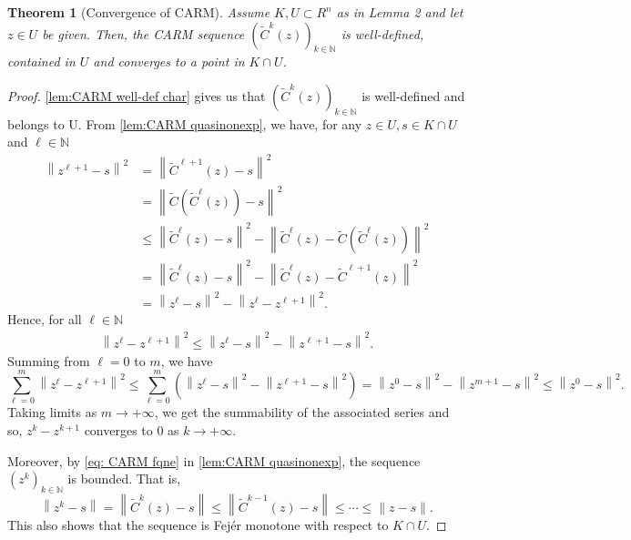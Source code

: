 \documentclass[smallextended,numbook,nospthms]{svjour3}
\theoremstyle{plain}
\newtheorem{theorem}{Theorem}[section]
\theoremstyle{definition}
\def\NN{\mathds N}
\begin{document}
\begin{theorem}[Convergence of CARM]\label{thm:CARM conv}
	Assume $K, U \subset R^{n}$ as in Lemma 2 and let $z \in U$ be given. Then, the CARM sequence $\left(\tilde{C}^{k}(z)\right)_{k \in \NN}$ is well-defined, contained in $U$ and converges to a point in $K \cap U$.
\end{theorem}
\begin{proof}
	 \cref{lem:CARM well-def char} gives us that $\left(\tilde{C}^{k}(z)\right)_{k \in \NN}$ is well-defined and belongs to U.
	From  \cref{lem:CARM quasinonexp}, we have, for any $z \in U, s \in K \cap U$ and $\ell \in \NN$
	\begin{align}
		\left\|z^{\ell+1}-s\right\|^{2} &=\left\|\tilde{C}^{\ell+1}(z)-s\right\|^{2} \\
		&=\left\|\tilde{C}\left(\tilde{C}^{\ell}(z)\right)-s\right\|^{2} \\
		& \leq\left\|\tilde{C}^{\ell}(z)-s\right\|^{2}-\left\|\tilde{C}^{\ell}(z)-\tilde{C}\left(\tilde{C}^{\ell}(z)\right)\right\|^{2} \\
		&=\left\|\tilde{C}^{\ell}(z)-s\right\|^{2}-\left\|\tilde{C}^{\ell}(z)-\tilde{C}^{\ell+1}(z)\right\|^{2} \\
		&=\left\|z^{\ell}-s\right\|^{2}-\left\|z^{\ell}-z^{\ell+1}\right\|^{2}.
	\end{align}
	Hence, for all $\ell \in \NN$
	\begin{align}
		\left\|z^{\ell}-z^{\ell+1}\right\|^{2} \leq\left\|z^{\ell}-s\right\|^{2}-\left\|z^{\ell+1}-s\right\|^{2}.
	\end{align} 
	Summing from $\ell=0$ to $m$, we have
	\begin{equation}
		\sum_{\ell=0}^{m}\left\|z^{\ell}-z^{\ell+1}\right\|^{2} \leq \sum_{\ell=0}^{m}\left(\left\|z^{\ell}-s\right\|^{2}-\left\|z^{\ell+1}-s\right\|^{2}\right)=\left\|z^{0}-s\right\|^{2}-\left\|z^{m+1}-s\right\|^{2} \leq\left\|z^{0}-s\right\|^{2}.
	\end{equation}
	Taking limits as $m \rightarrow+\infty$, we get the summability of the associated series and so, $z^{k}-z^{k+1}$ converges to 0 as $k \rightarrow+\infty$.
	
	Moreover, by \cref{eq: CARM fqne} in  \cref{lem:CARM quasinonexp}, the sequence $\left(z^{k}\right)_{k \in \NN}$ is bounded. That is,
	\begin{equation}
		\left\|z^{k}-s\right\| = \left\|\tilde{C}^{k}(z)-s\right\| \leq\left\|\tilde{C}^{k-1}(z)-s\right\| \leq \cdots \leq\|z-s\|.
	\end{equation}
	This also shows that the sequence is Fejér monotone with respect to $K \cap U$.
	

\end{proof}
\end{document}
